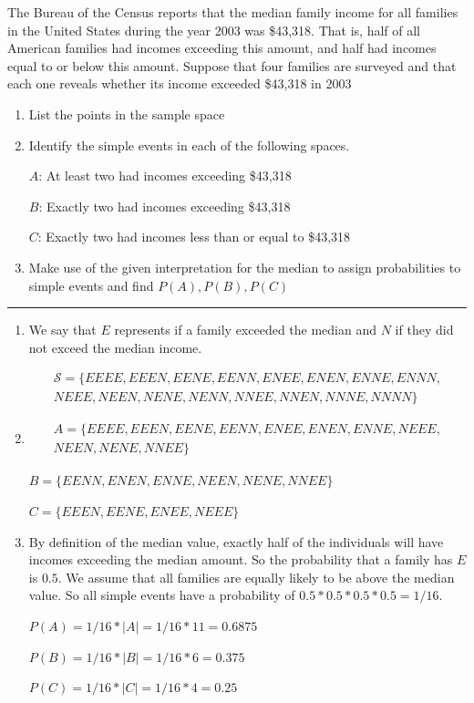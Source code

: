 \documentclass[11pt]{article}
\begin{document}
 
The Bureau of the Census reports that the median family income for all families in the United
States during the year 2003 was \$43,318. That is, half of all American families had incomes
exceeding this amount, and half had incomes equal to or below this amount. Suppose that four
families are surveyed and that each one reveals whether its income exceeded \$43,318 in 2003
\begin{enumerate}[\textbf{a}]
 	\item List the points in the sample space
 	\item Identify the simple events in each of the following spaces.
 	
 	
		\quad $A$: \quad At least two had incomes exceeding \$43,318 	
 	
 		\quad $B$: \quad Exactly two had incomes exceeding \$43,318
 	
 		\quad $C$: \quad Exactly two had incomes less than or equal to \$43,318
 	
 	\item Make use of the given interpretation for the median to assign probabilities to simple events and find $P(A), P(B), P(C)$  
\end{enumerate}
\hrule

\begin{enumerate}[a]

	\item We say that $E$ represents if a family exceeded the median and $N$ if they did not exceed the median income. 
	
	\begin{multline*}
	\mathcal{S} = \{EEEE, EEEN, EENE, EENN, ENEE, ENEN, ENNE, ENNN, \\ 
	NEEE, NEEN, NENE, NENN, NNEE, NNEN, NNNE, NNNN\}
	\end{multline*}
	
	
	
	
	\item
	
	\quad \begin{multline*}
	A = \{EEEE, EEEN, EENE, EENN, ENEE, ENEN, ENNE, NEEE,\\
	 NEEN, NENE, NNEE\}
	\end{multline*}	
	
	\quad $B = \{EENN, ENEN, ENNE, NEEN, NENE, NNEE\}$
	
	\quad $C = \{EEEN, EENE, ENEE, NEEE\}$
	
	
	\item By definition of the median value, exactly half of the individuals will have incomes exceeding the median amount. So the probability that a family has $E$ is $0.5$. We assume that all families are equally likely to be above the median value. So all simple events have a probability of $0.5 * 0.5 *0.5 * 0.5 = 1/16$.
	
	$P(A) = 1/16 * |A| = 1/16 * 11 = 0.6875$ 
	
	$P(B) = 1/16 * |B| = 1/16 * 6 = 0.375$ 
	
	$P(C) = 1/16 * |C| = 1/16 * 4 = 0.25$ 

\end{enumerate}
\end{document}
